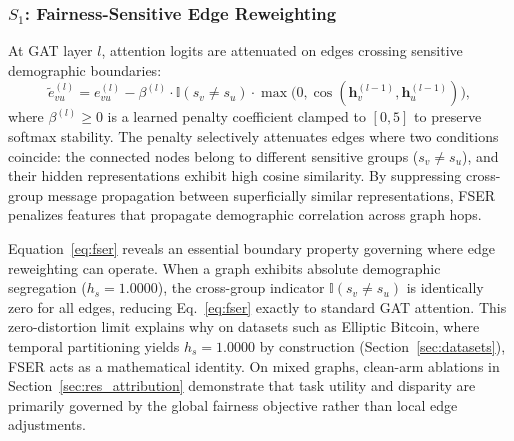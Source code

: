 \documentclass[preprint,12pt]{elsarticle}
\theoremstyle{plain}
\theoremstyle{definition}
\theoremstyle{remark}
\begin{document}
\subsubsection{\texorpdfstring{$S_1$:}{S1:} Fairness-Sensitive Edge Reweighting}
At GAT layer $l$, attention logits are attenuated on edges crossing sensitive demographic boundaries:
\begin{equation}
\tilde{e}^{(l)}_{vu} = e^{(l)}_{vu} - \beta^{(l)} \cdot \mathbb{I}(s_v \neq s_u) \cdot \max\!\big(0, \cos(\bm{h}^{(l-1)}_v, \bm{h}^{(l-1)}_u)\big),
\label{eq:fser}
\end{equation}
where $\beta^{(l)} \ge 0$ is a learned penalty coefficient clamped to $[0,5]$ to preserve softmax stability. The penalty selectively attenuates edges where two conditions coincide: the connected nodes belong to different sensitive groups ($s_v \neq s_u$), and their hidden representations exhibit high cosine similarity. By suppressing cross-group message propagation between superficially similar representations, FSER penalizes features that propagate demographic correlation across graph hops.

Equation~\eqref{eq:fser} reveals an essential boundary property governing where edge reweighting can operate. When a graph exhibits absolute demographic segregation ($h_s = 1.0000$), the cross-group indicator $\mathbb{I}(s_v \neq s_u)$ is identically zero for all edges, reducing Eq.~\eqref{eq:fser} exactly to standard GAT attention. This zero-distortion limit explains why on datasets such as Elliptic Bitcoin, where temporal partitioning yields $h_s = 1.0000$ by construction (Section~\ref{sec:datasets}), FSER acts as a mathematical identity. On mixed graphs, clean-arm ablations in Section~\ref{sec:res_attribution} demonstrate that task utility and disparity are primarily governed by the global fairness objective rather than local edge adjustments.
\end{document}
